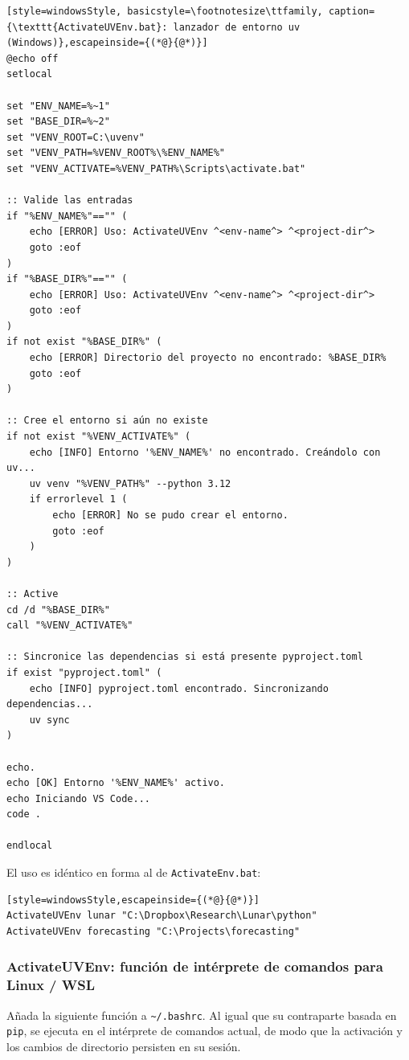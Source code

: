 \begin{lstlisting}[style=windowsStyle, basicstyle=\footnotesize\ttfamily, caption={\texttt{ActivateUVEnv.bat}: lanzador de entorno uv (Windows)},escapeinside={(*@}{@*)}]
@echo off
setlocal

set "ENV_NAME=%~1"
set "BASE_DIR=%~2"
set "VENV_ROOT=C:\uvenv"
set "VENV_PATH=%VENV_ROOT%\%ENV_NAME%"
set "VENV_ACTIVATE=%VENV_PATH%\Scripts\activate.bat"

:: Valide las entradas
if "%ENV_NAME%"=="" (
    echo [ERROR] Uso: ActivateUVEnv ^<env-name^> ^<project-dir^>
    goto :eof
)
if "%BASE_DIR%"=="" (
    echo [ERROR] Uso: ActivateUVEnv ^<env-name^> ^<project-dir^>
    goto :eof
)
if not exist "%BASE_DIR%" (
    echo [ERROR] Directorio del proyecto no encontrado: %BASE_DIR%
    goto :eof
)

:: Cree el entorno si aún no existe
if not exist "%VENV_ACTIVATE%" (
    echo [INFO] Entorno '%ENV_NAME%' no encontrado. Creándolo con uv...
    uv venv "%VENV_PATH%" --python 3.12
    if errorlevel 1 (
        echo [ERROR] No se pudo crear el entorno.
        goto :eof
    )
)

:: Active
cd /d "%BASE_DIR%"
call "%VENV_ACTIVATE%"

:: Sincronice las dependencias si está presente pyproject.toml
if exist "pyproject.toml" (
    echo [INFO] pyproject.toml encontrado. Sincronizando dependencias...
    uv sync
)

echo.
echo [OK] Entorno '%ENV_NAME%' activo.
echo Iniciando VS Code...
code .

endlocal
\end{lstlisting}

El uso es idéntico en forma al de \texttt{ActivateEnv.bat}:

\begin{lstlisting}[style=windowsStyle,escapeinside={(*@}{@*)}]
ActivateUVEnv lunar "C:\Dropbox\Research\Lunar\python"
ActivateUVEnv forecasting "C:\Projects\forecasting"
\end{lstlisting}

\subsubsection{ActivateUVEnv: función de intérprete de comandos para Linux / WSL}

Añada la siguiente función a \texttt{\textasciitilde/.bashrc}. Al igual que
su contraparte basada en \texttt{pip}, se ejecuta en el intérprete de
comandos actual, de modo que la activación y los cambios de directorio
persisten en su sesión.

